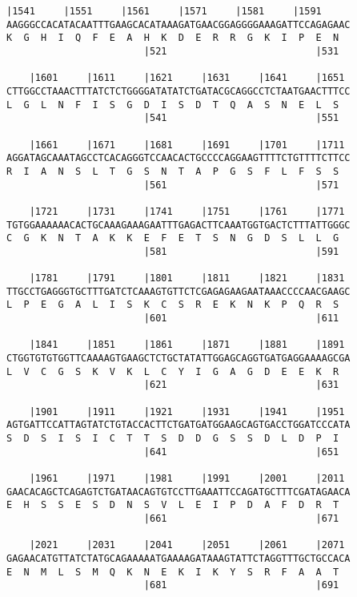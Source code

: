 \documentclass{article}
\begin{document}
\begin{Verbatim}[fontfamily=courier]
    |1541     |1551     |1561     |1571     |1581     |1591 
AAGGGCCACATACAATTTGAAGCACATAAAGATGAACGGAGGGGAAAGATTCCAGAGAAC
K  G  H  I  Q  F  E  A  H  K  D  E  R  R  G  K  I  P  E  N  
                        |521                          |531  

    |1601     |1611     |1621     |1631     |1641     |1651 
CTTGGCCTAAACTTTATCTCTGGGGATATATCTGATACGCAGGCCTCTAATGAACTTTCC
L  G  L  N  F  I  S  G  D  I  S  D  T  Q  A  S  N  E  L  S  
                        |541                          |551  

    |1661     |1671     |1681     |1691     |1701     |1711 
AGGATAGCAAATAGCCTCACAGGGTCCAACACTGCCCCAGGAAGTTTTCTGTTTTCTTCC
R  I  A  N  S  L  T  G  S  N  T  A  P  G  S  F  L  F  S  S  
                        |561                          |571  

    |1721     |1731     |1741     |1751     |1761     |1771 
TGTGGAAAAAACACTGCAAAGAAAGAATTTGAGACTTCAAATGGTGACTCTTTATTGGGC
C  G  K  N  T  A  K  K  E  F  E  T  S  N  G  D  S  L  L  G  
                        |581                          |591  

    |1781     |1791     |1801     |1811     |1821     |1831 
TTGCCTGAGGGTGCTTTGATCTCAAAGTGTTCTCGAGAGAAGAATAAACCCCAACGAAGC
L  P  E  G  A  L  I  S  K  C  S  R  E  K  N  K  P  Q  R  S  
                        |601                          |611  

    |1841     |1851     |1861     |1871     |1881     |1891 
CTGGTGTGTGGTTCAAAAGTGAAGCTCTGCTATATTGGAGCAGGTGATGAGGAAAAGCGA
L  V  C  G  S  K  V  K  L  C  Y  I  G  A  G  D  E  E  K  R  
                        |621                          |631  

    |1901     |1911     |1921     |1931     |1941     |1951 
AGTGATTCCATTAGTATCTGTACCACTTCTGATGATGGAAGCAGTGACCTGGATCCCATA
S  D  S  I  S  I  C  T  T  S  D  D  G  S  S  D  L  D  P  I  
                        |641                          |651  

    |1961     |1971     |1981     |1991     |2001     |2011 
GAACACAGCTCAGAGTCTGATAACAGTGTCCTTGAAATTCCAGATGCTTTCGATAGAACA
E  H  S  S  E  S  D  N  S  V  L  E  I  P  D  A  F  D  R  T  
                        |661                          |671  

    |2021     |2031     |2041     |2051     |2061     |2071 
GAGAACATGTTATCTATGCAGAAAAATGAAAAGATAAAGTATTCTAGGTTTGCTGCCACA
E  N  M  L  S  M  Q  K  N  E  K  I  K  Y  S  R  F  A  A  T  
                        |681                          |691  

\end{Verbatim}
\end{document}
